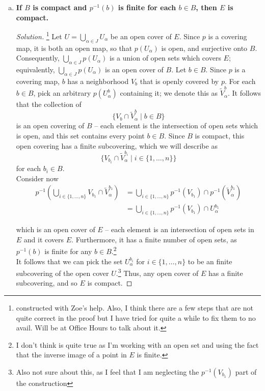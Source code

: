 \documentclass[11pt]{article}
\newenvironment{solution}
  {\renewcommand\qedsymbol{$\blacksquare$}\begin{proof}[Solution]}
  {\end{proof}}
\begin{document}
\begin{enumerate}[b)]
    \item \textbf{If $B$ is compact and $p^{-1}(b)$ is finite for each $b \in B$, then $E$ is compact.}
    
    \begin{solution}\footnote{constructed with Zoe's help. Also, I think there are a few steps that are not quite correct in the proof but I have tried for quite a while to fix them to no avail.
    Will be at Office Hours to talk about it.}
    Let $U = \bigcup\limits_{\alpha \in J} U_\alpha$ be an open cover of $E$. Since $p$ is a covering map, it is both an open map, so that $p(U_\alpha)$ is open, and surjective onto $B$. Consequently,
    $\bigcup\limits_{\alpha \in J} p(U_\alpha)$ is a union of open sets which covers $E$; equivalently, $\bigcup\limits_{\alpha \in J} p(U_\alpha)$ is an open cover of $B$. Let $b \in B$. Since $p$ is a covering map, 
    $b$ has a neighborhood $V_b$ that is openly covered by $p$. For each $b \in B$, pick an arbitrary $p(U_\alpha^b)$ containing it; we denote this as $\tilde{V}_\alpha^b$. It follows that the collection of
    \[
        \{ V_b \cap \tilde{V}_\alpha^b \mid b \in B \} 
    \]
    is an open covering of $B$ -- each element is the intersection of open sets which is open, and this set contains every point $b \in B$. 
    Since $B$ is compact, this open covering has a finite subcovering, which we will describe as
    \[
       \{ V_{b_i} \cap \tilde{V}_\alpha^{b_i} \mid i \in \{ 1, \dots, n \} \}
    \]
    for each $b_i \in B$. \\

    Consider now 
    \begin{align*}
        p^{-1} \left( \bigcup_{i \in \{ 1, \dots, n \}} V_{b_1} \cap \tilde{V}_\alpha^{b_1} \right) &= \bigcup_{i \in \{ 1, \dots, n \}} p^{-1}(V_{b_1}) \cap p^{-1}(\tilde{V}_\alpha^{b_1}) \\
        &= \bigcup_{i \in \{ 1, \dots, n \}} p^{-1}(V_{b_1}) \cap U_\alpha^{b_1}
    \end{align*}

    which is an open cover of $E$ -- each element is an intersection of open sets in $E$ and it covers $E$. Furthermore, it has a finite number of open sets, 
    as $p^{-1}(b)$ is finite for any $b \in B$.\footnote{I don't think is quite true as I'm working with an open set and using the fact that the inverse image of a point in $E$ is finite.} \\

    It follows that we can pick the set $U_\alpha^{b_i}$ for $i\in \{ 1, \dots, n \}$ to be an finite subcovering of the open cover $U$.\footnote{Also not sure about this, as I feel that I am neglecting the $p^{-1}(V_{b_1})$ part of the construction} Thus, any open cover of $E$ has a finite subcovering,
    and so $E$ is compact.
    \end{solution}
\end{enumerate}
\end{document}
